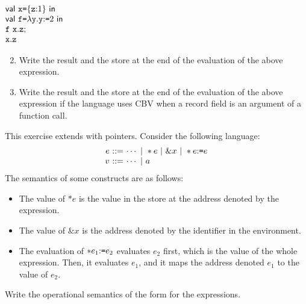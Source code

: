 \begin{exercise}
$
\begin{array}{@{}l@{}}
  \ebind{\cx}{\{\cz{:}1\}}{ \\
  \ebind{\cf}{\efun{\cy}{\eset{\cy}{2}}}{ \\
  \eseq{\eapp{\cf}{\cx.\cz}}{ \\
  \cx.\cz}}}
\end{array}
$

\begin{enumerate}
  \setcounter{enumi}{1}
  \item Write the result and the store at the end of the evaluation of
  the above expression.
  \item Write the result and the store at the end of the evaluation of
  the above expression
  if the language uses CBV when a record field is an argument
  of a function call.
\end{enumerate}

\end{exercise}

\begin{exercise}

This exercise extends \lang with pointers.
Consider the following language:
\[
  \begin{array}{@{}r@{~}r@{~}l@{}}
    e & ::= & \cdots\ |\ \ast e \ |\ \& x\ |\ \ast\eset{e}{e} \\
    v & ::= & \cdots\ |\ a \\
  \end{array}
\]
The semantics of some constructs are as follows:
\begin{itemize}
  \item The value of $\ast e$ is the value in the store at the address denoted by
    the expression.
  \item The value of $\& x$ is the address denoted by the identifier in the environment.
  \item The evaluation of $\ast e_1{:}\texttt{=} e_2$ evaluates $e_2$ first, which is
    the value of the whole expression. Then, it evaluates $e_1$, and it maps the
    address denoted $e_1$ to the value of $e_2$.
\end{itemize}
Write the operational semantics of the form  for the expressions.

\end{exercise}

